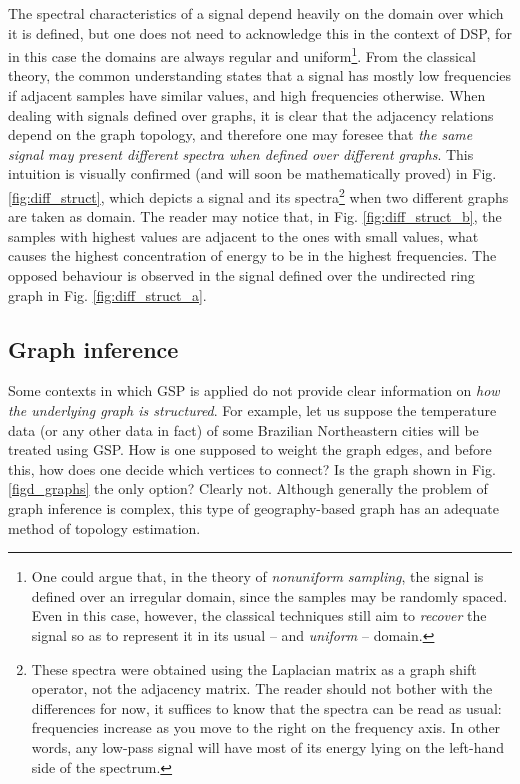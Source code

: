 The spectral characteristics of a signal depend heavily on the domain over which it is defined, but one does not need to acknowledge this in the context of DSP, for in this case the domains are always regular and uniform\footnote{One could argue that, in the theory of \emph{nonuniform sampling}, the signal is defined over an irregular domain, since the samples may be randomly spaced. Even in this case, however, the classical techniques still aim to \emph{recover} the signal so as to represent it in its usual -- and \emph{uniform} -- domain.
}.
From the classical theory, the common understanding states that a signal has mostly low frequencies if adjacent samples have similar values, and high frequencies otherwise. When dealing with signals defined over graphs, it is clear that the adjacency relations depend on the graph topology, and therefore one may foresee that \emph{the same signal may present different spectra when defined over different graphs}. This intuition is visually confirmed (and will soon be mathematically proved) in Fig. \ref{fig:diff_struct}, which depicts a signal and its spectra\footnote{These spectra were obtained using the Laplacian matrix as a graph shift operator, not the adjacency matrix. The reader should not bother with the differences for now, it suffices to know that the spectra can be read as usual: frequencies increase as you move to the right on the frequency axis. In other words, any low-pass signal will have most of its energy lying on the left-hand side of the spectrum.} when two different graphs are taken as domain. The reader may notice that, in Fig. \ref{fig:diff_struct_b}, the samples with highest values are adjacent to the ones with small values, what causes the highest concentration of energy to be in the highest frequencies. The opposed behaviour is observed in the signal defined over the undirected ring graph in Fig. \ref{fig:diff_struct_a}.

\subsection{Graph inference}
\label{subsec:inferindo}

Some contexts in which GSP is applied do not provide clear information on \emph{how the underlying graph is structured}. For example, let us suppose the temperature data (or any other data in fact) of some Brazilian Northeastern cities will be treated using GSP. How is one supposed to weight the graph edges, and before this, how does one decide which vertices to connect? Is the graph shown in Fig. \ref{figd_graphs} the only option? Clearly not. Although generally the problem of graph inference is complex, this type of geography-based graph has an adequate method of topology estimation.

